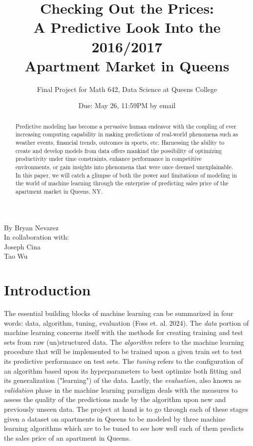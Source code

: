 \documentclass[12pt]{article}
\title{Checking Out the Prices: \\ A Predictive Look Into the 2016/2017 \\Apartment Market in Queens}
\author{Final Project for Math 642, Data Science at Queens College}
\date{Due: May 26, 11:59PM by email}
\begin{document}
\maketitle

\begin{flushright}
By Bryan Nevarez\\
In collaboration with:\\
Joseph Cina \\
Tao Wu
\end{flushright}

\begin{abstract}
\noindent Predictive modeling has become a pervasive human endeavor with the coupling of ever increasing computing capability in making predictions of real-world phenomena such as weather events, financial trends, outcomes in sports, etc. Harnessing the ability to create and develop models from data offers mankind the possibility of optimizing productivity under time constraints, enhance performance in competitive environments, or gain insights into phenomena that were once deemed unexplainable. In this paper, we will catch a glimpse of both the power and limitations of modeling in the world of machine learning through the enterprise of predicting sales price of the apartment market in Queens, NY. 
\end{abstract}

\newpage

\section{Introduction}

The essential building blocks of machine learning can be summarized in four words: data, algorithm, tuning, evaluation (Foss et. al. 2024). The \textit{data} portion of machine learning concerns itself with the methods for creating training and test sets from raw (un)structured data. The \textit{algorithm} refers to the machine learning procedure that will be implemented to be trained upon a given train set to test its predictive performance on test sets. The \textit{tuning} refers to the configuration of an algorithm based upon its hyperparameters to best optimize both fitting and its generalization ("learning") of the data. Lastly, the \textit{evaluation}, also known as \textit{validation} phase in the machine learning paradigm deals with the measures to assess the quality of the predictions made by the algorithm upon new and previously unseen data. The project at hand is to go through each of these stages given a dataset on apartments in Queens to be modeled by three machine learning algorithms which are to be tuned to see how well each of them predicts the sales price of an apartment in Queens. 
\end{document}
